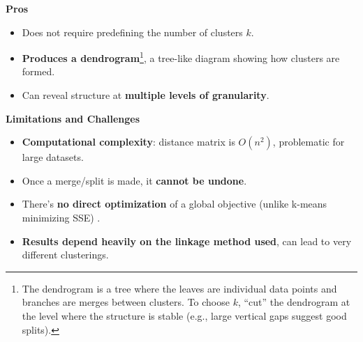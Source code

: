 \highspace
\begin{flushleft}
    \textcolor{Green3}{ \textbf{Pros}}
\end{flushleft}
\begin{itemize}[label=\textcolor{Green3}{}]
    \item Does not require predefining the number of clusters $k$.
    \item \textbf{Produces a dendrogram}\footnote{%
        The dendrogram is a tree where the leaves are individual data points and branches are merges between clusters. To choose $k$, ``cut'' the dendrogram at the level where the structure is stable (e.g., large vertical gaps suggest good splits).
    }, a tree-like diagram showing how clusters are formed.
    \item Can reveal structure at \textbf{multiple levels of granularity}.
\end{itemize}

\highspace
\begin{flushleft}
    \textcolor{Red2}{ \textbf{Limitations and Challenges}}
\end{flushleft}
\begin{itemize}[label=\textcolor{Red2}{}]
    \item \textbf{Computational complexity}: distance matrix is $O(n^{2})$, problematic for large datasets.
    \item Once a merge/split is made, it \textbf{cannot be undone}.
    \item There's \textbf{no direct optimization} of a global objective (unlike k-means minimizing SSE)  .
    \item \textbf{Results depend heavily on the linkage method used}, can lead to very different clusterings.
\end{itemize}